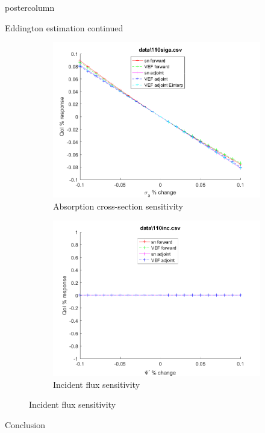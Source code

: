 \documentclass[xcolor={usenames,dvipsnames,svgnames,table}]{beamer}
\begin{document}
\begin{frame}
\begin{columns}
\begin{column}{.33\textwidth}
\begin{beamercolorbox}[center,wd=\textwidth]{postercolumn}
\begin{minipage}[T]{0.95\textwidth}
{\begin{block}{Eddington estimation continued}
\begin{figure}[H]
\begin{subfigure}{.4\textwidth}
  \centering
  \includegraphics[width=.98\linewidth]{110sigaSens.png}
  \caption{Absorption cross-section sensitivity}
  \label{fig:sfig5}
\end{subfigure}%
\begin{subfigure}{.4\textwidth}
  \centering
  \includegraphics[width=.98\linewidth]{110incSens.png}
  \caption{Incident flux sensitivity}
  \label{fig:sfig4}
\end{subfigure}
\label{fig:fig}
\end{figure}			    
			    
			    
			    \end{block}
			    \vfill
			    \begin{block}{Conclusion}


\end{block}}
\end{minipage}
\end{beamercolorbox}
\end{column}
\end{columns}
\end{frame}
\end{document}
